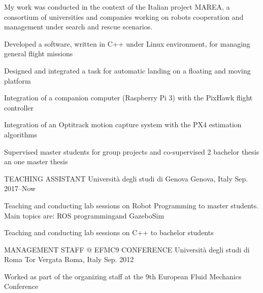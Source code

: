 \begin{cventries}
    {
      \begin{cvparagraph}
      My work was conducted in the context of the Italian project MAREA, a consortium of universities and companies working on robots cooperation and management under search and rescue scenarios.
      \end{cvparagraph}
      \begin{cvitems} %
        \item {Developed a software, written in C++ under Linux environment, for managing general flight missions}
        \item {Designed and integrated a task for  automatic landing on a floating and moving platform}
        \item {Integration of a companion computer (Raspberry Pi 3) with the PixHawk flight controller}
        \item {Integration of an Optitrack motion capture system with the PX4 estimation algorithms}
        \item {Supervised master students for group projects and co-supervised 2 bachelor thesis an one master thesis}
     \end{cvitems}
    }

  \cventry
    {TEACHING ASSISTANT} %
    {Università degli studi di Genova} %
    {Genova, Italy} %
    {Sep. 2017–Now} %
    {
      \begin{cvitems} %
        \item {Teaching and conducting lab sessions on Robot Programming to master students. Main topics are: ROS programmingand GazeboSim}
        \item {Teaching and conducting lab sessions on C++ to bachelor students}
      \end{cvitems}
    }
  \cventry
    {MANAGEMENT STAFF @ EFMC9 CONFERENCE} %
    {Università degli studi di Roma Tor Vergata} %
    {Roma, Italy} %
    {Sep. 2012} %
    {
      \begin{cvitems} %
        \item {Worked as part of the organizing staff at the 9th European Fluid Mechanics Conference}
      \end{cvitems}
    }

\end{cventries}
